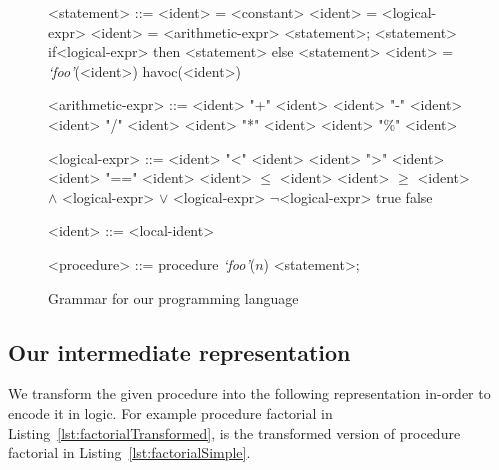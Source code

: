 \documentclass{llncs}
\newcommand{\foo}{\textit{`foo'}}
\newcommand{\n}{\textit{n}}
\begin{document}
\begin{figure}[hb!]
  \begin{grammar}
    <statement> ::= <ident> = <constant>
    \alt <ident> = <logical-expr>
    \alt <ident> = <arithmetic-expr>
    \alt <statement>; <statement>
    \alt if<logical-expr> then <statement> else <statement>
    \alt <ident> = \foo(<ident>)
    \alt havoc(<ident>)


    <arithmetic-expr> ::= <ident> "+" <ident>
    \alt <ident> "-" <ident>
    \alt <ident> "/" <ident>
    \alt <ident> "*" <ident>
    \alt <ident> "\%" <ident>
 
    <logical-expr> ::= <ident> "<" <ident>
    \alt <ident> ">" <ident>
    \alt <ident> "==" <ident>
    \alt <ident> $\leq$ <ident>
    \alt <ident> $\geq$ <ident>
     $\wedge$ <logical-expr>
     $\vee$ <logical-expr>
    \alt $\neg$<logical-expr>
    \alt true
    \alt false

    <ident> ::= <local-ident>
    
    <procedure> ::= procedure \foo ($\n$) {<statement>;}
  \end{grammar}
  \caption{Grammar for our programming language}
  \label{fig:grammar}
\end{figure}

\subsection{Our intermediate representation}\label{sec:intermediate}
We transform the given procedure into the following representation
in-order to encode it in logic. For example procedure factorial
in Listing~\ref{lst:factorialTransformed}, is the transformed version
of procedure factorial in Listing~\ref{lst:factorialSimple}.
\end{document}
